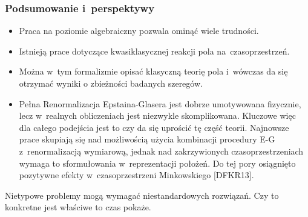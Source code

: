 \documentclass[10pt,t]{beamer}
\begin{document}
\begin{frame}
  \frametitle{Podsumowanie i~perspektywy}


  \begin{itemize}
    \RaggedRight

  \item Praca na poziomie algebraiczny pozwala ominąć wiele
    trudności.

  \item Istnieją prace dotyczące kwasiklasycznej reakcji pola
    na~czasoprzestrzeń.

  \item Można w~tym formalizmie opisać klasyczną teorię pola
    i~wówczas da się otrzymać wyniki o zbieżności badanych
    szeregów.

  \item Pełna Renormalizacja Epstaina-Glasera jest dobrze umotywowana
    fizycznie, lecz w~realnych obliczeniach jest niezwykle skomplikowana.
    Kluczowe więc dla całego podejścia jest to czy da się uprościć tę
    część teorii. Najnowsze prace skupiają się nad możliwością użycia
    kombinacji procedury E-G z~renormalizacją wymiarową, jednak nad
    zakrzywionych czasoprzestrzeniach wymaga to sformułowania
    w~reprezentacji położeń. Do tej pory osiągnięto pozytywne efekty
    w~czasoprzestrzeni Minkowskiego [DFKR13].

  \end{itemize}

\end{frame}





\begin{frame}[standout]


  { \color{jFrametitleFGColor} Nietypowe problemy mogą wymagać
    niestandardowych rozwiązań. Czy to konkretne jest właściwe to czas
    pokaże. }

\end{frame}










\appendix





\end{document}
